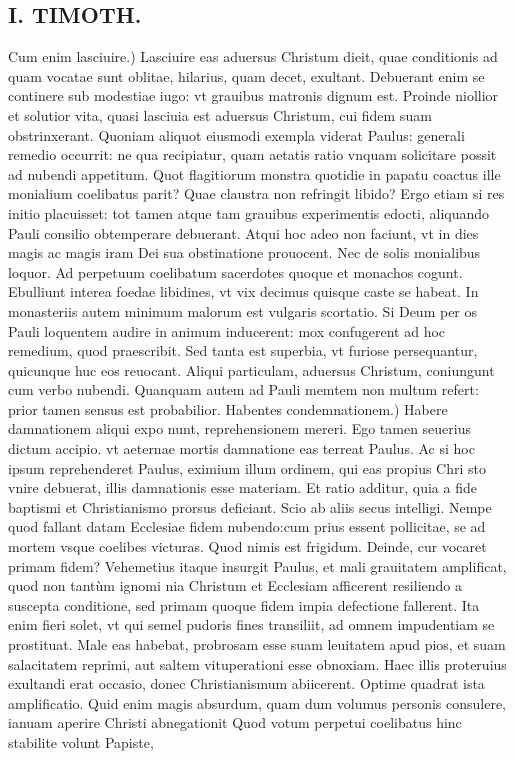 \documentclass{article}
\begin{document}
\begin{pages}
\section*{I. TIMOTH. }
\marginpar{[ p.62 ]}\pstart Cum enim lasciuire.) Lasciuire eas aduersus Christum dieit, quae conditionis ad quam vocatae sunt oblitae, hilarius, quam decet, exultant. Debuerant enim se continere sub modestiae iugo: vt grauibus matronis dignum est. Proinde niollior et solutior vita, quasi lasciuia est aduersus Christum, cui fidem suam obstrinxerant. Quoniam aliquot eiusmodi exempla viderat Paulus: generali remedio occurrit: ne qua recipiatur, quam aetatis ratio vnquam solicitare possit ad nubendi appetitum. Quot flagitiorum monstra quotidie in papatu coactus ille monialium coelibatus parit? Quae claustra non refringit libido? Ergo etiam si res initio placuisset: tot tamen atque tam grauibus experimentis edocti, aliquando Pauli consilio obtemperare debuerant. Atqui hoc adeo non faciunt, vt in dies magis ac magis iram Dei sua obstinatione prouocent. Nec de solis monialibus loquor. Ad perpetuum coelibatum sacerdotes quoque et monachos cogunt. Ebulliunt interea foedae libidines, vt vix decimus quisque caste se habeat. In monasteriis autem minimum malorum est vulgaris scortatio. Si Deum per os Pauli loquentem audire in animum inducerent: mox confugerent ad hoc remedium, quod praescribit. Sed tanta est superbia, vt furiose persequantur, quicunque huc eos reuocant. Aliqui particulam, aduersus Christum, coniungunt cum verbo nubendi. Quanquam autem ad Pauli memtem non multum refert: prior tamen sensus est probabilior.  \pend\pstart Habentes condemnationem.) Habere damnationem aliqui expo nunt, reprehensionem mereri. Ego tamen seuerius dictum accipio. vt aeternae mortis damnatione eas terreat Paulus. Ac si hoc ipsum reprehenderet Paulus, eximium illum ordinem, qui eas propius Chri sto vnire debuerat, illis damnationis esse materiam. Et ratio additur, quia a fide baptismi et Christianismo prorsus deficiant. Scio ab aliis secus intelligi. Nempe quod fallant datam Ecclesiae fidem nubendo:cum prius essent pollicitae, se ad mortem vsque coelibes victuras. Quod nimis est frigidum. Deinde, cur vocaret primam fidem? Vehemetius itaque insurgit Paulus, et mali grauitatem amplificat, quod non tantùm ignomi nia Christum et Ecclesiam afficerent resiliendo a suscepta conditione, sed primam quoque fidem impia defectione fallerent. Ita enim fieri solet, vt qui semel pudoris fines transiliit, ad omnem impudentiam se prostituat. Male eas habebat, probrosam esse suam leuitatem apud pios, et suam salacitatem reprimi, aut saltem vituperationi esse obnoxiam. Haec illis proteruius exultandi erat occasio, donec Christianismum abiicerent. Optime quadrat ista amplificatio. Quid enim magis absurdum, quam dum volumus personis consulere, ianuam aperire Christi abnegationit Quod votum perpetui coelibatus hinc stabilite volunt Papiste,  \pend

\end{pages}
\end{document}
